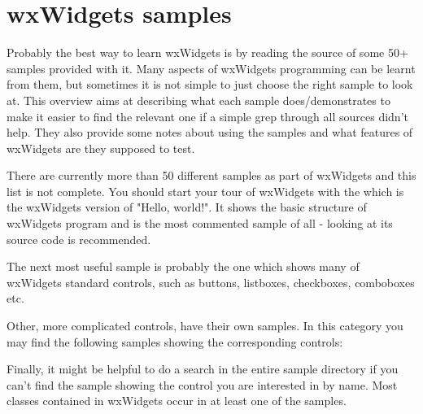 
\section{wxWidgets samples}\label{samples}

Probably the best way to learn wxWidgets is by reading the source of some 50+
samples provided with it. Many aspects of wxWidgets programming can be learnt
from them, but sometimes it is not simple to just choose the right sample to
look at. This overview aims at describing what each sample does/demonstrates to
make it easier to find the relevant one if a simple grep through all sources
didn't help. They also provide some notes about using the samples and what
features of wxWidgets are they supposed to test.

There are currently more than 50 different samples as part of wxWidgets and
this list is not complete. You should start your tour of wxWidgets with the
 which is the wxWidgets version of
"Hello, world!". It shows the basic structure of wxWidgets program and is the
most commented sample of all - looking at its source code is recommended.

The next most useful sample is probably the 
one which shows many of wxWidgets standard controls, such as buttons,
listboxes, checkboxes, comboboxes etc.

Other, more complicated controls, have their own samples. In this category you
may find the following samples showing the corresponding controls:

\begin{twocollist}\itemsep=0pt
\end{twocollist}

Finally, it might be helpful to do a search in the entire sample directory if
you can't find the sample showing the control you are interested in by
name. Most classes contained in wxWidgets occur in at least one of the samples.


